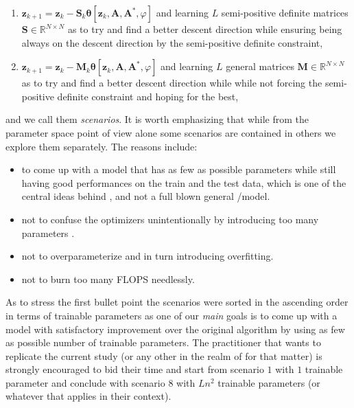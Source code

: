 \begin{enumerate}
  \item $\boldsymbol{z}_{k+1} = \boldsymbol{z}_k - \boldsymbol{S}_k\boldsymbol{\theta}[\boldsymbol{z}_k,\boldsymbol{A},\boldsymbol{A^*},\varphi]$ 
  and learning $L$ semi-positive definite matrices $\boldsymbol{S}\in \mathbb{R}^{N \times N}$ as to try and find a better descent direction while 
  ensuring being always on the descent direction by the semi-positive definite constraint,
  \item $\boldsymbol{z}_{k+1} = \boldsymbol{z}_k - \boldsymbol{M}_k\boldsymbol{\theta}[\boldsymbol{z}_k,\boldsymbol{A},\boldsymbol{A^*},\varphi]$ 
  and learning $L$ general matrices $\boldsymbol{M}\in \mathbb{R}^{N \times N}$ as to try and find a better descent direction while 
  while not forcing the semi-positive definite constraint and hoping for the best,
\end{enumerate}
and we call them \emph{scenarios}. It is worth emphasizing that while from the parameter space point of view alone some scenarios are 
contained in others we explore them separately. The reasons include:

\begin{itemize}
  \item to come up with a model that has as few as possible parameters while still having 
  good performances on the train and the test data, which is one of the central ideas behind 
  \du\cite{Shechtman2015}\index{\du}, and not a full blown general \ml/\dl model.
  \item not to confuse the optimizers unintentionally by introducing too many parameters \cite{Sankararaman2019}.
  \item not to overparameterize and in turn introducing overfitting\cite{Bishop2006}\cite{Goodfellow2016}\cite{ShalevShwartz2014}.
  \item not to burn too many \ac{FLOPS} needlessly.
\end{itemize}
As to stress the first bullet point the scenarios were sorted in the ascending order in terms of trainable parameters as one of our \emph{main} goals 
is to come up with a model with satisfactory improvement over the original algorithm by using as few as possible number of trainable parameters. 
The practitioner that wants to replicate the current study (or any other in the realm of \du for that matter) is strongly encouraged to bid 
their time and start from scenario $1$ with $1$ trainable parameter and conclude with scenario $8$ with $Ln^2$ trainable parameters (or whatever 
that applies in their context).

